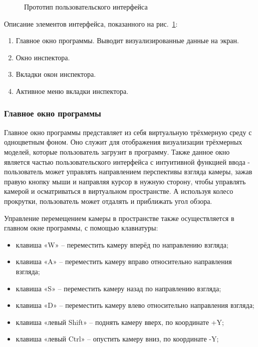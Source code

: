 \begin{figure}[H]
\caption{Прототип пользовательского интерфейса}
\label{maket2:image}
\end{figure}

Описание элементов интерфейса, показанного на рис.~\ref{maket2:image}:
\begin{enumerate}
	\item Главное окно программы. Выводит визуализированные данные на экран.
	\item Окно инспектора.
	\item Вкладки окон инспектора.
	\item Активное меню вкладки инспектора.
\end{enumerate}

\subsubsection{Главное окно программы}

Главное окно программы представляет из себя виртуальную трёхмерную среду с одноцветным фоном. Оно служит для отображения визуализации трёхмерных моделей, которые пользователь загрузит в программу. Также данное окно является частью пользовательского интерфейса с интуитивной функцией ввода - пользователь может управлять направлением перспективы взгляда камеры, зажав правую кнопку мыши и направляя курсор в нужную сторону, чтобы управлять камерой и осматриваться в виртуальном пространстве. А используя колесо прокрутки, пользователь может отдалять и приближать угол обзора.

Управление перемещением камеры в пространстве также осуществляется в главном окне программы, с помощью клавиатуры:
\begin{itemize}
	\item клавиша «W» – переместить камеру вперёд по направлению взгляда;
	\item клавиша «A» – переместить камеру вправо относительно направления взгляда;
	\item клавиша «S» – переместить камеру назад по направлению взгляда;
	\item клавиша «D» – переместить камеру влево относительно направления взгляда;
	\item клавиша «левый Shift» – поднять камеру вверх, по координате +Y;
	\item клавиша «левый Ctrl» – опустить камеру вниз, по координате -Y;
\end{itemize}

